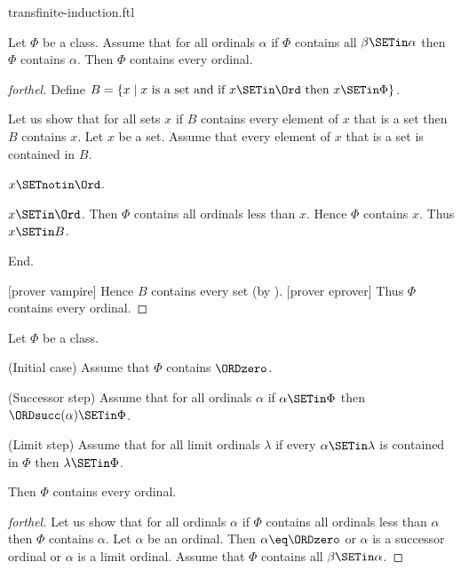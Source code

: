 \documentclass{naproche-library}
\begin{document}
\begin{smodule}[title=Transfinite Induction]{transfinite-induction.ftl}

\begin{theorem}[forthel,id=SET_THEORY_02_8493935460614144]
  Let $\Phi$ be a class.
  Assume that for all ordinals $\alpha$ if $\Phi$ contains all $\beta \SETin \alpha$ then $\Phi$ contains $\alpha$.
  Then $\Phi$ contains every ordinal.
\end{theorem}
\begin{proof}[forthel]
  Define $B = \{ x \mid x\text{ is a set and if }x \SETin \Ord\text{ then }x \SETin \Phi \}$.

  Let us show that for all sets $x$ if $B$ contains every element of $x$ that is a set then $B$ contains $x$.
    Let $x$ be a set.
    Assume that every element of $x$ that is a set is contained in $B$.

    \begin{case}{$x \SETnotin \Ord$.} \end{case}

    \begin{case}{$x \SETin \Ord$.}
      Then $\Phi$ contains all ordinals less than $x$.
      Hence $\Phi$ contains $x$.
      Thus $x \SETin B$.
    \end{case}
  End.

  [prover vampire]
  Hence $B$ contains every set (by ).
  [prover eprover]
  Thus $\Phi$ contains every ordinal.
\end{proof}

\begin{theorem}[forthel,id=SET_THEORY_02_7892040431960064]
  Let $\Phi$ be a class.
  
  (Initial case) Assume that $\Phi$ contains $\ORDzero$.
  
  (Successor step) Assume that for all ordinals $\alpha$ if $\alpha \SETin \Phi$ then $\ORDsucc(\alpha) \SETin \Phi$.
  
  (Limit step) Assume that for all limit ordinals $\lambda$ if every $\alpha \SETin \lambda$ is contained in $\Phi$ then $\lambda \SETin \Phi$.
  
  Then $\Phi$ contains every ordinal.
\end{theorem}
\begin{proof}[forthel]
  Let us show that for all ordinals $\alpha$ if $\Phi$ contains all ordinals
  less than $\alpha$ then $\Phi$ contains $\alpha$.
    Let $\alpha$ be an ordinal.
    Then $\alpha \eq \ORDzero$ or $\alpha$ is a successor ordinal or $\alpha$ is a
    limit ordinal.
    Assume that $\Phi$ contains all $\beta \SETin \alpha$.


\end{proof}
\end{smodule}
\end{document}
